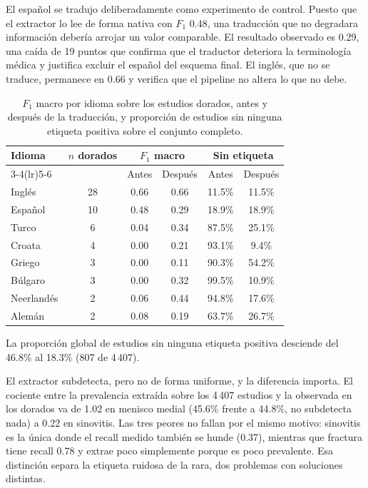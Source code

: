 \documentclass{article}
\begin{document}
El español se tradujo deliberadamente como experimento de control. Puesto que el
extractor lo lee de forma nativa con $F_1$ 0.48, una traducción que no degradara
información debería arrojar un valor comparable. El resultado observado es 0.29,
una caída de 19 puntos que confirma que el traductor deteriora la terminología
médica y justifica excluir el español del esquema final. El inglés, que no se
traduce, permanece en 0.66 y verifica que el pipeline no altera lo que no debe.

\begin{table}[htbp]
\centering
\caption{$F_1$ macro por idioma sobre los estudios dorados, antes y después de la
         traducción, y proporción de estudios sin ninguna etiqueta positiva sobre
         el conjunto completo.}
\begin{tabular}{lccccc}
\toprule
\multirow{2}{*}{Idioma} & \multirow{2}{*}{$n$ dorados} &
\multicolumn{2}{c}{$F_1$ macro} & \multicolumn{2}{c}{Sin etiqueta} \\
\cmidrule(lr){3-4}\cmidrule(lr){5-6}
 & & Antes & Después & Antes & Después \\
\midrule
Inglés     & 28 & 0.66 & 0.66 & 11.5\% & 11.5\% \\
Español    & 10 & 0.48 & 0.29 & 18.9\% & 18.9\% \\
Turco      &  6 & 0.04 & 0.34 & 87.5\% & 25.1\% \\
Croata     &  4 & 0.00 & 0.21 & 93.1\% &  9.4\% \\
Griego     &  3 & 0.00 & 0.11 & 90.3\% & 54.2\% \\
Búlgaro    &  3 & 0.00 & 0.32 & 99.5\% & 10.9\% \\
Neerlandés &  2 & 0.06 & 0.44 & 94.8\% & 17.6\% \\
Alemán     &  2 & 0.08 & 0.19 & 63.7\% & 26.7\% \\
\bottomrule
\end{tabular}
\end{table}

La proporción global de estudios sin ninguna etiqueta positiva desciende del
46.8\% al 18.3\% (807 de 4\,407).

El extractor subdetecta, pero no de forma uniforme, y la diferencia
importa. El cociente entre la prevalencia extraída sobre los 4\,407 estudios y
la observada en los dorados va de 1.02 en menisco medial (45.6\%
frente a 44.8\%, no subdetecta nada) a 0.22 en sinovitis. Las tres
peores no fallan por el mismo motivo: sinovitis es la única donde el recall
medido también se hunde (0.37), mientras que fractura tiene recall 0.78 y
extrae poco simplemente porque es poco prevalente. Esa distinción separa la
etiqueta ruidosa de la rara, dos problemas con soluciones distintas.
\end{document}

